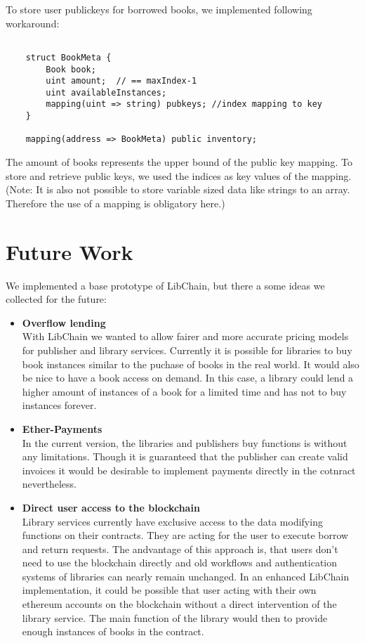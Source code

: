 \begin{itemize}
To store user publickeys for borrowed books, we implemented following workaround:

\begin{minipage}{\linewidth}
\begin{lstlisting}

	struct BookMeta {
		Book book;
		uint amount;  // == maxIndex-1
		uint availableInstances;
		mapping(uint => string) pubkeys; //index mapping to key
	}

	mapping(address => BookMeta) public inventory;
\end{lstlisting}
\end{minipage}

The amount of books represents the upper bound of the public key mapping. To store and retrieve public keys, we used the indices as key values of the mapping.
(Note: It is also not possible to store variable sized data like strings to an array. Therefore the use of a mapping is obligatory here.)
\end{itemize}


\section{Future Work}
We implemented a base prototype of LibChain, but there a some ideas we collected for the future:

\begin{itemize}
\item \textbf{Overflow lending}\\
With LibChain we wanted to allow fairer and more accurate pricing models for publisher and library services. Currently it is possible for libraries to buy book instances similar to the puchase of books in the real world. It would also be nice to have a book access on demand. In this case, a library could lend a higher amount of instances of a book for a limited time and has not to buy instances forever.

\item \textbf{Ether-Payments}\\
In the current version, the libraries and publishers buy functions is without any limitations. Though it is guaranteed that the publisher can create valid invoices it would be desirable to implement payments directly in the cotnract nevertheless.

\item \textbf{Direct user access to the blockchain}\\
Library services currently have exclusive access to the data modifying functions on their contracts. They are acting for the user to execute borrow and return requests. The andvantage of this approach is, that users don't need to use the blockchain directly and old workflows and authentication systems of libraries can nearly remain unchanged.
In an enhanced LibChain implementation, it could be possible that user acting with their own ethereum accounts on the blockchain without a direct intervention of the library service. The main function of the library would then to provide enough instances of books in the contract.

\end{itemize}

